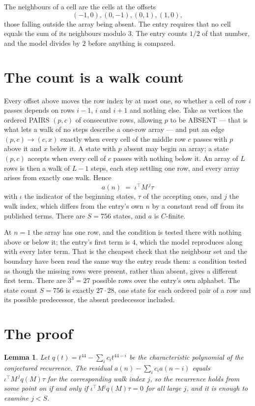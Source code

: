 \documentclass[11pt,a4paper]{article}
\theoremstyle{plain}
\newtheorem{lemma}[theorem]{Lemma}
\theoremstyle{definition}
\begin{document}
The neighbours of a cell are the cells at the offsets
\[
(-1,0), (0,-1), (0,1), (1,0),
\]
those falling outside the array being absent. The entry requires that no cell equals the sum of its neighbours modulo $3$. The entry counts $1/2$ of that number, and the model divides by $2$ before anything is compared.

\section{The count is a walk count}

Every offset above moves the row index by at most one, so whether a cell of row $i$ passes
depends on rows $i-1$, $i$ and $i+1$ and nothing else. Take as vertices the ordered PAIRS
$(p,c)$ of consecutive rows, allowing $p$ to be ABSENT --- that is what lets a walk of no steps
describe a one-row array --- and put an edge $(p,c)\to(c,x)$ exactly when every cell of the
middle row $c$ passes with $p$ above it and $x$ below it. A state with $p$ absent may begin an
array; a state $(p,c)$ accepts when every cell of $c$ passes with nothing below it. An array of
$L$ rows is then a walk of $L-1$ steps, each step settling one row, and every array arises from
exactly one walk. Hence
\[
a(n)\;=\;\iota^{\!\top}M^{\,j}\tau
\]
with $\iota$ the indicator of the beginning states, $\tau$ of the accepting ones, and $j$ the
walk index, which differs from the entry's own $n$ by a constant read off from its published
terms. There are $S=756$ states, and $a$ is $C$-finite.

At $n=1$ the array has one row, and
the condition is tested there with nothing above or below it; the entry's first term is
$4$, which the model reproduces along with every later term. That is the cheapest check
that the neighbour set and the boundary have been read the same way the entry reads them: a
condition tested as though the missing rows were present, rather than absent, gives a different
first term. There are $3^{3}=27$ possible rows over the entry's own alphabet. The state count $S=756$ is exactly $27\cdot28$,
one state for each ordered pair of a row and its possible predecessor, the absent predecessor
included.

\section{The proof}

\begin{lemma}\label{lem:crit}
Let $q(t)=t^{44}-\sum_i c_it^{44-i}$ be the characteristic polynomial of the
conjectured recurrence. The residual $a(n)-\sum_ic_ia(n-i)$ equals
$\iota^{\!\top}M^{\,j}q(M)\tau$ for the corresponding walk index $j$, so the recurrence
holds from some point on if and only if $\iota^{\!\top}M^{j}q(M)\tau=0$ for all large $j$,
and it is enough to examine $j<S$.
\end{lemma}
\end{document}
